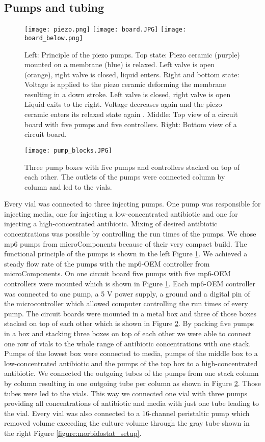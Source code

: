 \subsection{Pumps and tubing} 
\begin{figure}
	\texttt{[image: piezo.png]}
	\texttt{[image: board.JPG]}
	\texttt{[image: board\_below.png]}
	\caption{Left: Principle of the piezo pumps. Top state: Piezo ceramic (purple) mounted on a membrane (blue) is relaxed. Left valve is open (orange), right valve  is closed, liquid enters. Right and bottom state: Voltage is applied to the piezo ceramic deforming the membrane resulting in a down stroke. Left valve is closed, right valve is open Liquid exits to the right. Voltage decreases again and the piezo ceramic enters its relaxed state again \cite{piezo_pumps}. Middle: Top view of a circuit board with five pumps and five controllers. Right: Bottom view of a circuit board.} 
	\label{figure:pumps}
\end{figure}
\begin{figure}
	\texttt{[image: pump\_blocks.JPG]}
	\caption{Three pump boxes with five pumps and controllers stacked on top of each other. The outlets of the pumps were connected column by column and led to the vials.}
	\label{figure:tubing_setup}
\end{figure}
Every vial was connected to three injecting pumps. One pump was responsible for injecting media, one for injecting a low-concentrated antibiotic and one for injecting a high-concentrated antibiotic. Mixing of desired antibiotic concentrations was possible by controlling the run times of the pumps.
We chose mp6 pumps from microComponents because of their very compact build. The functional principle of the pumps is shown in the left Figure \ref{figure:pumps}. We achieved a steady flow rate of the pumps with the mp6-OEM controller from microComponents. On one circuit board five pumps with five mp6-OEM controllers were mounted which is shown in Figure \ref{figure:pumps}. Each mp6-OEM controller was connected to one pump, a 5 V power supply, a ground and a digital pin of the microcontroller which allowed computer controlling the run times of every pump. The circuit boards were mounted in a metal box and three of those boxes stacked on top of each other which is shown in Figure \ref{figure:tubing_setup}. By packing five pumps in a box and stacking three boxes on top of each other we were able to connect one row of vials to the whole range of antibiotic concentrations with one stack. Pumps of the lowest box were connected to media, pumps of the middle box to a low-concentrated antibiotic and the pumps of the top box to a high-concentrated antibiotic. We connected the outgoing tubes of the pumps from one stack column by column resulting in one outgoing tube per column as shown in Figure \ref{figure:tubing_setup}. Those tubes were led to the vials. This way we connected one vial with three pumps providing all concentrations of antibiotic and media with just one tube leading to the vial.
Every vial was also connected to a 16-channel peristaltic pump which removed volume exceeding the culture volume through the gray tube shown in the right Figure \ref{figure:morbidostat_setup}. 

